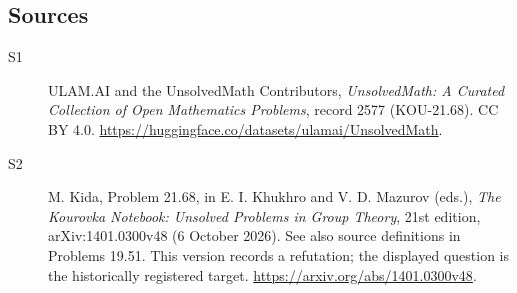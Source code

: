 \documentclass[11pt]{article}
\begin{document}
\subsection{Sources}
\begin{description}
\item[\hypertarget{source:2577:1}{S1}] ULAM.AI and the UnsolvedMath Contributors, \emph{UnsolvedMath: A Curated Collection of Open Mathematics Problems}, record 2577 (KOU-21.68). CC BY 4.0. \url{https://huggingface.co/datasets/ulamai/UnsolvedMath}.
\item[\hypertarget{source:2577:2}{S2}] M. Kida, Problem 21.68, in E. I. Khukhro and V. D. Mazurov (eds.), \emph{The Kourovka Notebook: Unsolved Problems in Group Theory}, 21st edition, arXiv:1401.0300v48 (6 October 2026). See also source definitions in Problems 19.51. This version records a refutation; the displayed question is the historically registered target. \url{https://arxiv.org/abs/1401.0300v48}.
\end{description}
\label{end:2577}
\end{document}
